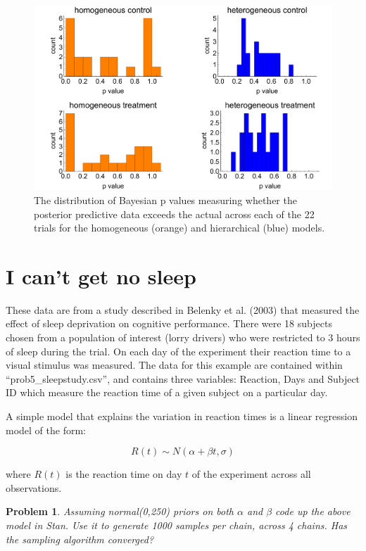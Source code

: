 \documentclass{article}
\newtheorem{problem}{Problem}[section]
\begin{document}
\begin{figure}[ht]
	\centerline{\includegraphics[width=1.5\textwidth]{figures/prob5_betaBlockersPPCs.pdf}}
	\caption{The distribution of Bayesian p values measuring whether the posterior predictive data exceeds the actual across each of the 22 trials for the homogeneous (orange) and hierarchical (blue) models.}\label{fig:prob5_betaBlockerPPCs}
\end{figure}

\section{I can't get no sleep}
These data are from a study described in Belenky et al. (2003) \cite{belenky2003patterns} that measured the effect of sleep deprivation on cognitive performance. There were 18 subjects chosen from a population of interest (lorry drivers) who were restricted to 3 hours of sleep during the trial. On each day of the experiment their reaction time to a visual stimulus was measured. The data for this example are contained within ``prob5\_sleepstudy.csv'', and contains three variables: Reaction, Days and Subject ID which measure the reaction time of a given subject on a particular day.

A simple model that explains the variation in reaction times is a linear regression model of the form:

\begin{equation}
R(t) \sim N(\alpha + \beta t,\sigma)
\end{equation}

where $R(t)$ is the reaction time on day $t$ of the experiment across all observations. 

\begin{problem}
	Assuming normal(0,250) priors on both $\alpha$ and $\beta$ code up the above model in Stan. Use it to generate 1000 samples per chain, across 4 chains. Has the sampling algorithm converged?
\end{problem}
\end{document}
